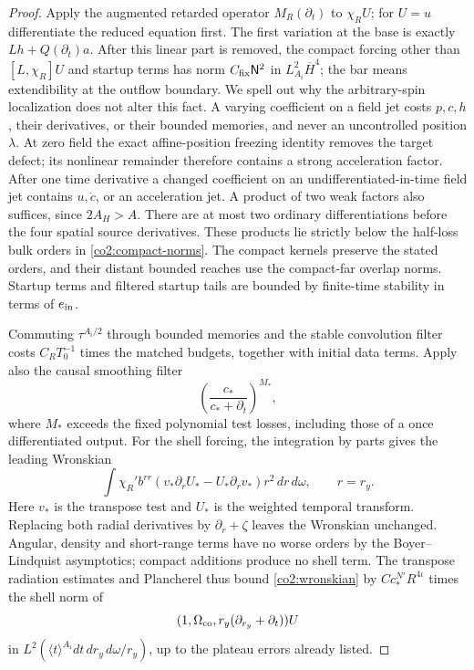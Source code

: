 \begin{proof}
Apply the augmented retarded operator $M_R(\partial_t)$ to $\chi_R U$;
for $U=u$ differentiate the reduced equation first.  The first variation at
the base is exactly $Lh+Q(\partial_t)a$.  After this linear part is removed,
the compact forcing other than $[L,\chi_R]U$ and startup terms has norm
$C_{\rm fix}\mathsf N^2$ in $L^2_{A_i}\overline H^4$; the bar means
extendibility at the outflow boundary.  We spell out why the arbitrary-spin
localization does not alter this fact.  A varying coefficient on a field jet
costs $p,c,h$, their derivatives, or their bounded memories, and never an
uncontrolled position $\lambda$.  At zero field the exact affine-position
freezing identity removes the target defect; its nonlinear remainder therefore
contains a strong acceleration factor.  After one time derivative a changed
coefficient on an undifferentiated-in-time field jet contains $u,\dot c$, or
an acceleration jet.  A product of two weak factors also suffices, since
$2A_H>A$.  There are at most two ordinary differentiations before the four
spatial source derivatives.  These products lie strictly below the half-loss
bulk orders in \eqref{co2:compact-norms}.  The compact kernels preserve the
stated orders, and their distant bounded reaches use the compact-far overlap
norms.  Startup terms and filtered startup tails are bounded by finite-time
stability in terms of $e_{\rm in}$.

Commuting $\tau^{A_i/2}$ through bounded memories and the stable convolution
filter costs $C_R T_0^{-1}$ times the matched budgets, together with initial
data terms.  Apply also the causal smoothing filter
\[
 \left(\frac{c_*}{c_*+\partial_t}\right)^{M_*},
\]
where $M_*$ exceeds the fixed polynomial test losses, including those of a
once differentiated output.  For the shell forcing, the integration by parts
gives the leading Wronskian
\begin{equation}\label{co2:wronskian}
 \int \chi_R' b^{rr}
       (v_*\partial_rU_*-U_*\partial_rv_*)r^2\,dr\,d\omega,
 \qquad r=r_y.
\end{equation}
Here $v_*$ is the transpose test and $U_*$ is the weighted temporal transform.
Replacing both radial derivatives by $\partial_r+\zeta$ leaves the
Wronskian unchanged.  Angular, density and short-range terms have no worse
orders by the Boyer--Lindquist asymptotics; compact additions produce no shell
term.  The transpose radiation estimates and Plancherel thus bound
\eqref{co2:wronskian} by $C c_*^{N'}R^{4\iota}$ times the shell norm of
\[
 (1,\Omega_{\rm co},r_y(\partial_{r_y}+\partial_t))U
\]
in $L^2(\langle t\rangle^{A_i}dt\,dr_y\,d\omega/r_y)$, up to the plateau
errors already listed.


\end{proof}

